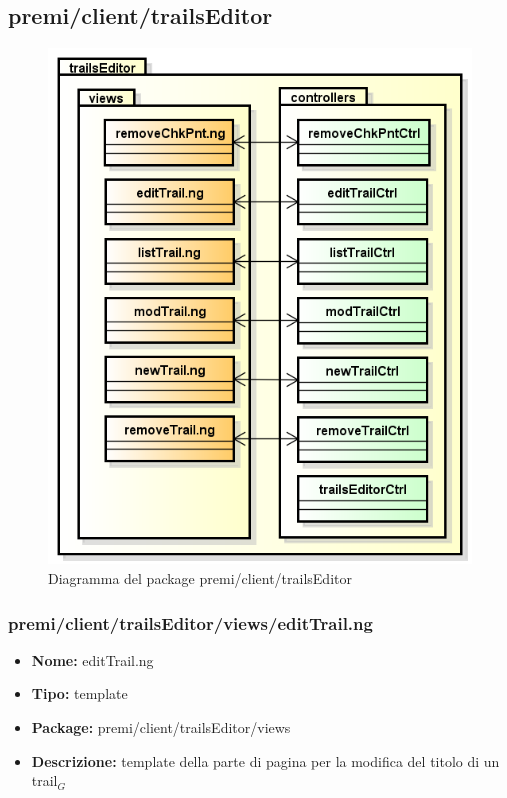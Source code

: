 \subsection{premi/client/trailsEditor}
\begin{figure}[!h]
\begin{center}
\includegraphics[scale=0.45]{img/diapkg/trailsEditor.png}
\caption{Diagramma del package premi/client/trailsEditor}
\end{center}
\end{figure}
\subsubsection{premi/client/trailsEditor/views/editTrail.ng}
\begin{itemize}
  \item[] \textbf{Nome:} editTrail.ng
  \item[] \textbf{Tipo:} template
  \item[] \textbf{Package:} premi/client/trailsEditor/views
  \item[] \textbf{Descrizione:}  template della parte di pagina per la modifica del titolo di un trail$_G$
\end{itemize}
